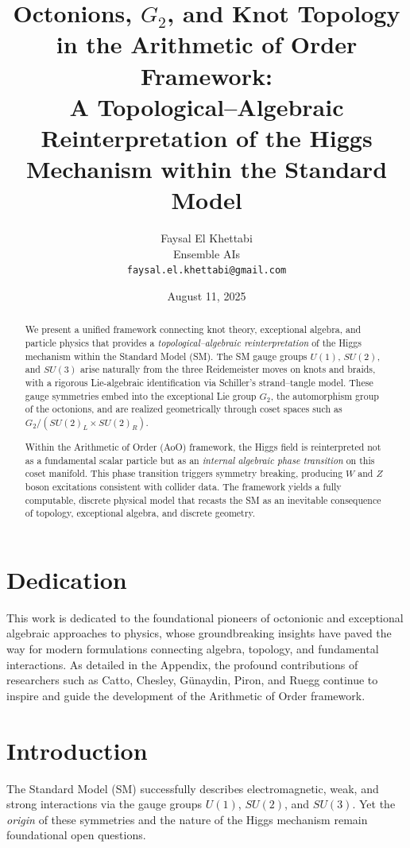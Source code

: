 \documentclass[12pt]{article}
\title{
Octonions, $G_2$, and Knot Topology in the Arithmetic of Order Framework:\\
A Topological--Algebraic Reinterpretation of the Higgs Mechanism within the Standard Model
}
\author{
    Faysal El Khettabi \\
    Ensemble AIs \\
    \texttt{faysal.el.khettabi@gmail.com}
}
\date{August 11, 2025}
\begin{document}
\maketitle
\section*{Dedication}

This work is dedicated to the foundational pioneers of octonionic and exceptional algebraic approaches to physics, whose groundbreaking insights have paved the way for modern formulations connecting algebra, topology, and fundamental interactions. As detailed in the Appendix, the profound contributions of researchers such as Catto, Chesley, Günaydin, Piron, and Ruegg continue to inspire and guide the development of the Arithmetic of Order framework.

\begin{abstract}
We present a unified framework connecting knot theory, exceptional algebra, and particle physics that provides a \emph{topological--algebraic reinterpretation} of the Higgs mechanism within the Standard Model (SM). The SM gauge groups $U(1)$, $SU(2)$, and $SU(3)$ arise naturally from the three Reidemeister moves on knots and braids, with a rigorous Lie-algebraic identification via Schiller’s strand--tangle model. These gauge symmetries embed into the exceptional Lie group $G_2$, the automorphism group of the octonions, and are realized geometrically through coset spaces such as $G_2 / (SU(2)_L \times SU(2)_R)$.  

Within the Arithmetic of Order (AoO) framework, the Higgs field is reinterpreted not as a fundamental scalar particle but as an \emph{internal algebraic phase transition} on this coset manifold. This phase transition triggers symmetry breaking, producing $W$ and $Z$ boson excitations consistent with collider data. The framework yields a fully computable, discrete physical model that recasts the SM as an inevitable consequence of topology, exceptional algebra, and discrete geometry.
\end{abstract}

\section{Introduction}

The Standard Model (SM) successfully describes electromagnetic, weak, and strong interactions via the gauge groups $U(1)$, $SU(2)$, and $SU(3)$. Yet the \emph{origin} of these symmetries and the nature of the Higgs mechanism remain foundational open questions.
\end{document}
